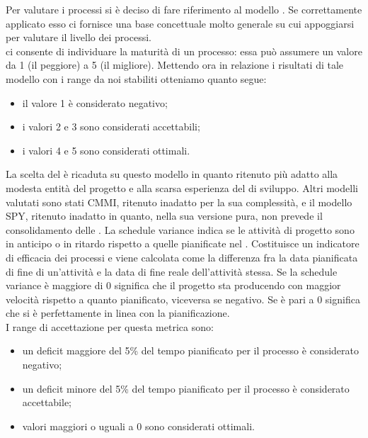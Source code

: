 					Per valutare i processi si è deciso di fare riferimento al modello . Se correttamente applicato esso ci fornisce una base 
					concettuale molto generale su cui appoggiarsi per valutare il livello dei processi.\\
					 ci consente di individuare la maturità di un processo: essa può assumere un valore da 1 (il peggiore) a 5 (il migliore). Mettendo ora in relazione i risultati di tale modello con i range da noi stabiliti otteniamo quanto segue:
					\begin{itemize}
						\item il valore 1 è considerato negativo;
						\item i valori 2 e 3 sono considerati accettabili;
						\item i valori 4 e 5 sono considerati ottimali.
					\end{itemize}
					La scelta del  è ricaduta su questo modello in quanto ritenuto più adatto alla modesta entità del progetto e alla scarsa esperienza del  di sviluppo. Altri modelli valutati sono stati CMMI, ritenuto inadatto per la sua complessità, e il modello SPY, ritenuto inadatto in quanto, nella sua versione pura, non prevede il consolidamento delle .
					La schedule variance indica se le attività di progetto sono in anticipo o in ritardo rispetto a quelle pianificate nel . Costituisce un indicatore di efficacia dei processi e viene calcolata come la differenza fra la data pianificata di fine di un'attività e la data di fine reale dell'attività stessa. Se la schedule variance è maggiore di 0 significa che il progetto sta producendo con maggior velocità rispetto a quanto pianificato, viceversa se negativo. Se è pari a 0 significa che si è perfettamente in linea con la pianificazione.\\
					I range di accettazione per questa metrica sono:
					\begin{itemize}
					\item un deficit maggiore del 5\% del tempo pianificato per il processo è considerato negativo;
					\item un deficit minore del 5\% del tempo pianificato per il processo è considerato accettabile;
					\item valori maggiori o uguali a 0 sono considerati ottimali.
					\end{itemize}
